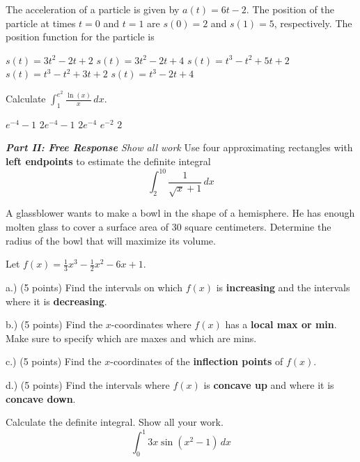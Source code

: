 \documentclass[11pt]{article}
\begin{document}
\begin{questions}
\begin{multiplechoice}{5}
\question The acceleration of a particle is given by $a(t) = 6t - 2$.  The position
of the particle at times $t = 0$ and $t = 1$ are $s(0) = 2$ and $s(1) = 5$, respectively.  
The position function for the particle is
\begin{answers}{2}
\ans $s(t) = 3t^2 - 2t + 2$
\ans $s(t) = 3t^2 - 2t + 4$
\ans $s(t) = t^3 - t^2 + 5t + 2$
\ans $s(t) = t^3 - t^2 + 3t + 2$
\ans $s(t) = t^3 - 2t + 4$
\end{answers}

\question Calculate $\int_1^{e^2} \frac{\ln(x)}{x} \, dx$.
\begin{answers}{2}
\ans $e^{-4} - 1$ 
\ans $2e^{-4} - 1$
\ans $2e^{-4}$
\ans $e^{-2}$
\ans $2$
\end{answers}

\end{multiplechoice}
\vspace{.2in}

\newpage

\noindent \emph{{\bf Part II: Free Response}{  Show all work}}
\question[10] Use four approximating rectangles with \textbf{left endpoints} to
estimate the definite integral
$$\int_2^{10} \frac{1}{\sqrt{x} + 1} \, dx$$


\newpage


\question[12] A glassblower wants to make a bowl in the shape of a hemisphere.  He has enough molten glass to cover a surface area of 30 square centimeters.  Determine the radius of the bowl that
will maximize its volume.

\newpage


\question[20]  Let $f(x) = \frac{1}{3}x^3 - \frac{1}{2}x^2 - 6x  + 1$.

a.) (5 points) Find the intervals on which $f(x)$ is
 \textbf{increasing} and the intervals where it is 
\textbf{decreasing}.

\vspace{2in}


b.) (5 points) Find the $x$-coordinates where $f(x)$
has a \textbf{local max or min}.  Make sure to
specify which are maxes and which are mins.

\vspace{2in}

c.) (5 points) Find the $x$-coordinates of the \textbf{inflection
points} of $f(x)$.

\vspace{2in}

d.)  (5 points) Find the intervals where
$f(x)$ is \textbf{concave up} and where it is
\textbf{concave down}.

\newpage

\question[10]  Calculate the definite integral. Show all your work.
$$\int_0^1 3x \sin(x^2 -1) \, dx$$


\mbox{}
\end{questions}
\end{document}
